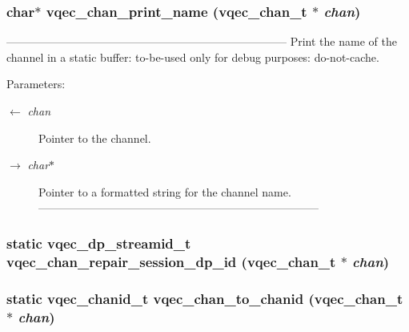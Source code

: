 \subsubsection{\setlength{\rightskip}{0pt plus 5cm}char$\ast$ vqec\_\-chan\_\-print\_\-name (\bf{vqec\_\-chan\_\-t} $\ast$ {\em chan})}\label{vqec__channel__private_8h_0d02e7062b9aad5d310b4d093bd1bb23}


--------------------------------------------------------------------------- Print the name of the channel in a static buffer: to-be-used only for debug purposes: do-not-cache.

\begin{Desc}
\item[Parameters:]
\begin{description}
\item[\mbox{$\leftarrow$} {\em chan}]Pointer to the channel. \item[\mbox{$\rightarrow$} {\em char$\ast$}]Pointer to a formatted string for the channel name. --------------------------------------------------------------------------- \end{description}
\end{Desc}
\subsubsection{\setlength{\rightskip}{0pt plus 5cm}static vqec\_\-dp\_\-streamid\_\-t vqec\_\-chan\_\-repair\_\-session\_\-dp\_\-id (\bf{vqec\_\-chan\_\-t} $\ast$ {\em chan})\hspace{0.3cm}{\tt  [inline, static]}}\label{vqec__channel__private_8h_3ec42b0507902481b88f2dd01e5db2da}


\subsubsection{\setlength{\rightskip}{0pt plus 5cm}static \bf{vqec\_\-chanid\_\-t} vqec\_\-chan\_\-to\_\-chanid (\bf{vqec\_\-chan\_\-t} $\ast$ {\em chan})\hspace{0.3cm}{\tt  [inline, static]}}\label{vqec__channel__private_8h_4a2a54e8e834f6b5d5add7b42807d45f}


